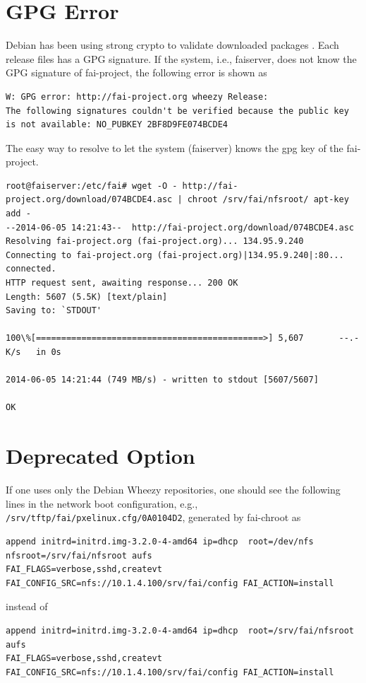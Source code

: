 \documentclass[11pt
  , a4paper
  , article
  , oneside
]{memoir}
\begin{document}
\section{GPG Error}
Debian has been using strong crypto to validate downloaded packages \citep{DEBIANSecureApt}. Each release files has a GPG signature. If the system, i.e., faiserver, does not know the GPG signature of fai-project, the following error is shown as
\begin{lstlisting}
W: GPG error: http://fai-project.org wheezy Release: 
The following signatures couldn't be verified because the public key is not available: NO_PUBKEY 2BF8D9FE074BCDE4
\end{lstlisting}
The easy way to resolve to let the system (faiserver) knows the gpg key of the fai-project. 

\begin{lstlisting}
root@faiserver:/etc/fai# wget -O - http://fai-project.org/download/074BCDE4.asc | chroot /srv/fai/nfsroot/ apt-key add -
--2014-06-05 14:21:43--  http://fai-project.org/download/074BCDE4.asc
Resolving fai-project.org (fai-project.org)... 134.95.9.240
Connecting to fai-project.org (fai-project.org)|134.95.9.240|:80... connected.
HTTP request sent, awaiting response... 200 OK
Length: 5607 (5.5K) [text/plain]
Saving to: `STDOUT'

100\%[=============================================>] 5,607       --.-K/s   in 0s      

2014-06-05 14:21:44 (749 MB/s) - written to stdout [5607/5607]

OK

\end{lstlisting}

\section{Deprecated Option}
If one uses only the Debian Wheezy repositories, one should see the following lines in the network boot configuration, e.g., \texttt{/srv/tftp/fai/pxelinux.cfg/0A0104D2}, generated by fai-chroot as 
\begin{lstlisting}
append initrd=initrd.img-3.2.0-4-amd64 ip=dhcp  root=/dev/nfs nfsroot=/srv/fai/nfsroot aufs  
FAI_FLAGS=verbose,sshd,createvt FAI_CONFIG_SRC=nfs://10.1.4.100/srv/fai/config FAI_ACTION=install
\end{lstlisting}
instead of 
\begin{lstlisting}
append initrd=initrd.img-3.2.0-4-amd64 ip=dhcp  root=/srv/fai/nfsroot aufs  
FAI_FLAGS=verbose,sshd,createvt FAI_CONFIG_SRC=nfs://10.1.4.100/srv/fai/config FAI_ACTION=install
\end{lstlisting}
\end{document}
